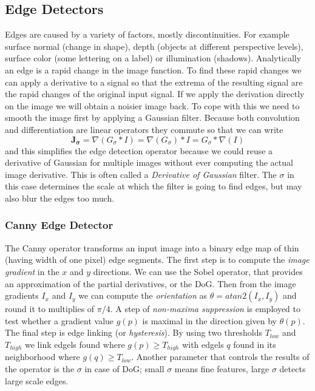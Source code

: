 \documentclass[a4paper,twocolumn]{article}
\begin{document}
\subsection{Edge Detectors}
Edges are caused by a variety of factors, mostly discontinuities. For example
surface normal (change in shape), depth (objects at different perspective
levels), surface color (some lettering on a label) or illumination (shadows).
Analytically an edge is a rapid change in the image function. To find these
rapid changes we can apply a derivative to a signal so that the extrema of the
resulting signal are the rapid changes of the original input signal. If we apply
the derivation directly on the image we will obtain a noisier image back. To
cope with this we need to smooth the image first by applying a Gaussian filter.
Because both convolution and differentiation are linear operators they commute
so that we can write
\begin{equation}
	\mathbf{J_{\sigma}} = \nabla (G_{\sigma} * I) = \nabla (G_{\sigma}) * I = G_{\sigma} * \nabla(I)
\end{equation}
and this simplifies the edge detection operator because we could reuse a
derivative of Gaussian for multiple images without ever computing the actual
image derivative. This is often called a \textit{Derivative of Gaussian} filter.
The $\sigma$ in this case determines the scale at which the filter is going to
find edges, but may also blur the edges too much.

\subsubsection{Canny Edge Detector}
The Canny operator transforms an input image into a binary edge map of thin
(having width of one pixel) edge segments. The first step is to compute the
\textit{image gradient} in the $x$ and $y$ directions. We can use the Sobel
operator, that provides an approximation of the partial derivatives, or the DoG.
Then from the image gradients $I_x$ and $I_y$ we can compute the
\textit{orientation} as $\theta = atan2(I_x, I_y)$ and round it to multiplies of
$\pi/4$. A step of \textit{non-maxima suppression} is employed to test whether a
gradient value $g(p)$ is maximal in the direction given by $\theta(p)$.
The final step is edge linking (or \textit{hysteresis}). By using two thresholds
$T_{low}$ and $T_{high}$ we link edgels found where $g(p) \ge T_{high}$ with
edgels $q$ found in its neighborhood where $g(q) \ge T_{low}$. Another parameter
that controls the results of the operator is the $\sigma$ in case of DoG; small
$\sigma$ means fine features, large $\sigma$ detects large scale edges.
\end{document}
